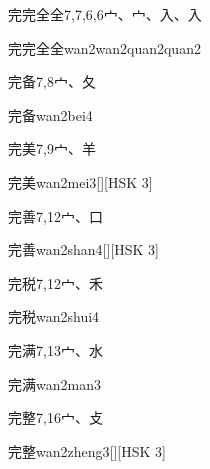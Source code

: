 \begin{entry}{完完全全}{7,7,6,6}{⼧、⼧、⼊、⼊}
  \begin{phonetics}{完完全全}{wan2wan2quan2quan2}
  \end{phonetics}
\end{entry}

\begin{entry}{完备}{7,8}{⼧、⼡}
  \begin{phonetics}{完备}{wan2bei4}
  \end{phonetics}
\end{entry}

\begin{entry}{完美}{7,9}{⼧、⽺}
  \begin{phonetics}{完美}{wan2mei3}[][HSK 3]
  \end{phonetics}
\end{entry}

\begin{entry}{完善}{7,12}{⼧、⼝}
  \begin{phonetics}{完善}{wan2shan4}[][HSK 3]
  \end{phonetics}
\end{entry}

\begin{entry}{完税}{7,12}{⼧、⽲}
  \begin{phonetics}{完税}{wan2shui4}
  \end{phonetics}
\end{entry}

\begin{entry}{完满}{7,13}{⼧、⽔}
  \begin{phonetics}{完满}{wan2man3}
  \end{phonetics}
\end{entry}

\begin{entry}{完整}{7,16}{⼧、⽁}
  \begin{phonetics}{完整}{wan2zheng3}[][HSK 3]
  \end{phonetics}
\end{entry}

